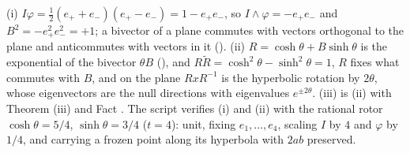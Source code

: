 (i) $I\varphi = \tfrac12(e_{+} + e_{-})(e_{+} - e_{-}) = 1 - e_{+}e_{-}$, so $I \wedge \varphi = -e_{+}e_{-}$ and $B^{2} = -e_{+}^{2}e_{-}^{2} = +1$; a bivector of a plane commutes with vectors orthogonal to the plane and anticommutes with vectors in it (). (ii) $R = \cosh\theta + B\sinh\theta$ is the exponential of the bivector $\theta B$ (), and $R\tilde R = \cosh^{2}\theta - \sinh^{2}\theta = 1$, $R$ fixes what commutes with $B$, and on the plane $RxR^{-1}$ is the hyperbolic rotation by $2\theta$, whose eigenvectors are the null directions with eigenvalues $e^{\pm 2\theta}$. (iii) is (ii) with Theorem (iii) and Fact . The script verifies (i) and (ii) with the rational rotor $\cosh\theta = 5/4$, $\sinh\theta = 3/4$ ($t = 4$): unit, fixing $e_{1}, \ldots, e_{4}$, scaling $I$ by $4$ and $\varphi$ by $1/4$, and carrying a frozen point along its hyperbola with $2ab$ preserved.
